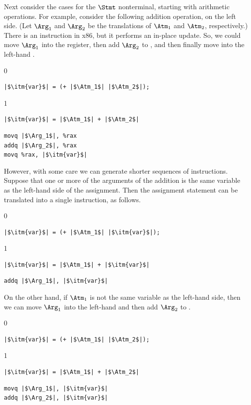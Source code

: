 \documentclass[7x10]{TimesAPriori_MIT}%
\def\racketEd{0}
\def\pythonEd{1}
\def\edition{1}
\newcommand{\pythonColor}[0]{}
\numberwithin{theorem}{chapter}
\numberwithin{definition}{chapter}
\numberwithin{equation}{chapter}
\begin{document}
Next consider the cases for the $\Stmt$ nonterminal, starting with
arithmetic operations. For example, consider the following addition
operation, on the left side.  (Let $\Arg_1$ and $\Arg_2$ be the
translations of $\Atm_1$ and $\Atm_2$, respectively.)  There is an
 instruction in x86, but it performs an in-place update.
%
So, we could move $\Arg_1$ into the  register, then add
$\Arg_2$ to , and then finally move  into the
left-hand . 
\begin{transformation}
{\if\edition\racketEd    
\begin{lstlisting}
|$\itm{var}$| = (+ |$\Atm_1$| |$\Atm_2$|);
\end{lstlisting}
\fi}
{\if\edition\pythonEd\pythonColor
\begin{lstlisting}
|$\itm{var}$| = |$\Atm_1$| + |$\Atm_2$|
\end{lstlisting}
\fi}
\compilesto
\begin{lstlisting}
movq |$\Arg_1$|, %rax
addq |$\Arg_2$|, %rax
movq %rax, |$\itm{var}$|
\end{lstlisting}
\end{transformation}
%
However, with some care we can generate shorter sequences of
instructions. Suppose that one or more of the arguments of the
addition is the same variable as the left-hand side of the assignment.
Then the assignment statement can be translated into a single
 instruction, as follows.
\begin{transformation}
{\if\edition\racketEd
\begin{lstlisting}
|$\itm{var}$| = (+ |$\Atm_1$| |$\itm{var}$|);
\end{lstlisting}
\fi}
{\if\edition\pythonEd\pythonColor
\begin{lstlisting}
|$\itm{var}$| = |$\Atm_1$| + |$\itm{var}$|
\end{lstlisting}
\fi}    
\compilesto
\begin{lstlisting}
addq |$\Arg_1$|, |$\itm{var}$|
\end{lstlisting}
\end{transformation}
%
On the other hand, if $\Atm_1$ is not the same variable as the
left-hand side, then we can move $\Arg_1$ into the left-hand 
and then add $\Arg_2$ to .
%
\begin{transformation}
{\if\edition\racketEd    
\begin{lstlisting}
|$\itm{var}$| = (+ |$\Atm_1$| |$\Atm_2$|);
\end{lstlisting}
\fi}
{\if\edition\pythonEd\pythonColor
\begin{lstlisting}
|$\itm{var}$| = |$\Atm_1$| + |$\Atm_2$|
\end{lstlisting}
\fi}
\compilesto
\begin{lstlisting}
movq |$\Arg_1$|, |$\itm{var}$|
addq |$\Arg_2$|, |$\itm{var}$|
\end{lstlisting}
\end{transformation}
\end{document}
